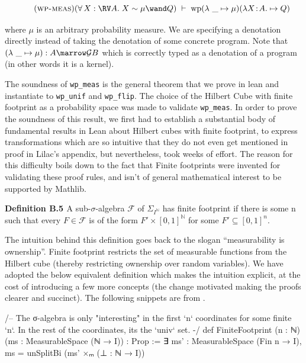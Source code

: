 \[
\tag{\textsc{wp-meas}}
(\forall\, X : \RV A.\; X \sim \mu \wand Q)
\;\vdash\;
\mathrm{wp} (\lambda\ \_ \mapsto \mu) ( \lambda X\!:\!A.\mapsto Q)
\]

where $\mu$ is an arbitrary probability measure. We are specifying a denotation directly instead of taking the denotation of some concrete program.
Note that $(\lambda\ \_ \mapsto \mu) : A \marrow \mathcal{G} B$ which is correctly typed as a denotation of a program
(in other words it is a kernel).


The soundness of \texttt{wp\_meas} is the general theorem that we prove in lean and instantiate to \texttt{wp\_unif} and \texttt{wp\_flip}. The choice of the Hilbert Cube
with finite footprint as a probability space was made to validate \texttt{wp\_meas}. In order to prove the soundness of this result, we first had to establish a
substantial body of fundamental results in Lean about Hilbert cubes with finite footprint, to express transformations which are so intuitive that they do
not even get mentioned in proof in Lilac's appendix, but nevertheless, took weeks of effort. The reason for this difficulty boils down to the fact that Finite footprints
were invented for validating these proof rules, and isn't of general mathematical interest to be supported by Mathlib.

\textbf{Definition B.5 \cite[Appendix B]{lilac}} A sub-$\sigma$-algebra $\mathcal{F}$ of $\Sigma_{I^\mathbb{N}}$ has finite footprint if there is some n such that every $F \in \mathcal{F}$
is of the form $F' \times [0,1]^\mathbb{N}$ for some $F' \subseteq [0,1]^n$.

The intuition behind this definition goes back to the slogan ``measurability is ownership''. Finite footprint restricts the set of measurable functions from the
Hilbert cube (thereby restricting ownership over random variables). We have adopted the below equivalent definition which makes the intuition explicit, at the cost of
introducing a few more concepts (the change motivated making the proofs clearer and succinct). The following snippets are from .

\begin{leancode}
/-- The σ-algebra is only "interesting" in the first `n` coordinates for
some finite `n`.  In the rest of the coordinates, its the `univ` set. -/
def FiniteFootprint (n : ℕ) (ms : MeasurableSpace (ℕ → I)) : Prop :=
  ∃ ms' : MeasurableSpace (Fin n → I), ms = unSplitBi (ms' ×ₘ (⊥ : ℕ → I))
\end{leancode}

